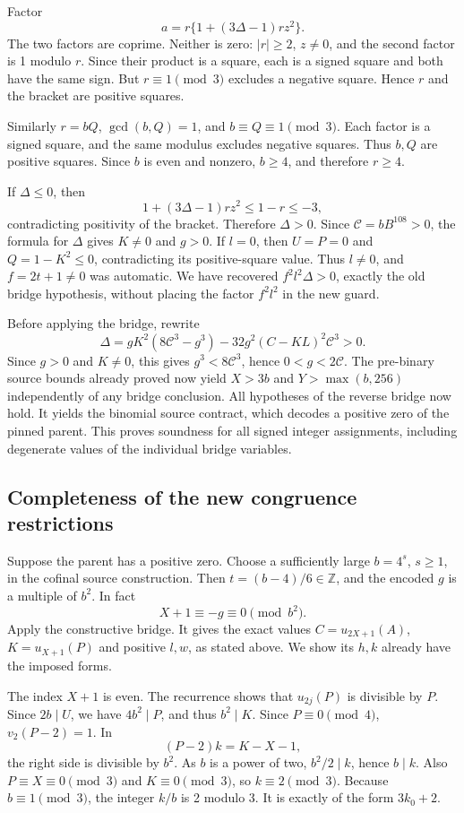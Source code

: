 Factor \[
 a=r\{1+(3\Delta-1)rz^2\}.
\] The two factors are coprime. Neither is zero: \(|r|\ge2\), \(z\ne0\),
and the second factor is 1 modulo \(r\). Since their product is a
square, each is a signed square and both have the same sign. But
\(r\equiv1\pmod3\) excludes a negative square. Hence \(r\) and the
bracket are positive squares.

Similarly \(r=bQ\), \(\gcd(b,Q)=1\), and \(b\equiv Q\equiv1\pmod3\).
Each factor is a signed square, and the same modulus excludes negative
squares. Thus \(b,Q\) are positive squares. Since \(b\) is even and
nonzero, \(b\ge4\), and therefore \(r\ge4\).

If \(\Delta\le0\), then \[
 1+(3\Delta-1)rz^2\le1-r\le-3,
\] contradicting positivity of the bracket. Therefore \(\Delta>0\).
Since \(\mathcal C=bB^{108}>0\), the formula for \(\Delta\) gives
\(K\ne0\) and \(g>0\). If \(l=0\), then \(U=P=0\) and \(Q=1-K^2\le0\),
contradicting its positive-square value. Thus \(l\ne0\), and
\(f=2t+1\ne0\) was automatic. We have recovered \(f^2l^2\Delta>0\),
exactly the old bridge hypothesis, without placing the factor \(f^2l^2\)
in the new guard.

Before applying the bridge, rewrite
\[
\Delta=gK^2(8\mathcal C^3-g^3)-32g^2(C-KL)^2\mathcal C^3>0.
\]
Since $g>0$ and $K\ne0$, this gives $g^3<8\mathcal C^3$, hence $0<g<2\mathcal C$. The pre-binary source bounds already proved now yield $X>3b$ and $Y>\max(b,256)$ independently of any bridge conclusion. All hypotheses of the reverse bridge now hold. It yields the binomial
source contract, which decodes a positive zero of the pinned parent.
This proves soundness for all signed integer assignments, including
degenerate values of the individual bridge variables.

\subsection{Completeness of the new congruence
restrictions}\label{completeness-of-the-new-congruence-restrictions}

Suppose the parent has a positive zero. Choose a sufficiently large
\(b=4^s\), \(s\ge1\), in the cofinal source construction. Then
\(t=(b-4)/6\in\mathbb Z\), and the encoded \(g\) is a multiple of
\(b^2\). In fact \[
 X+1\equiv-g\equiv0\pmod{b^2}.
\] Apply the constructive bridge. It gives the exact values
\(C=u_{2X+1}(A)\), \(K=u_{X+1}(P)\) and positive \(l,w\), as stated
above. We show its \(h,k\) already have the imposed forms.

The index \(X+1\) is even. The recurrence shows that \(u_{2j}(P)\) is
divisible by \(P\). Since \(2b\mid U\), we have \(4b^2\mid P\), and thus
\(b^2\mid K\). Since \(P\equiv0\pmod4\), \(v_2(P-2)=1\). In \[
 (P-2)k=K-X-1,
\] the right side is divisible by \(b^2\). As \(b\) is a power of two,
\(b^2/2\mid k\), hence \(b\mid k\). Also \(P\equiv X\equiv0\pmod3\) and
\(K\equiv0\pmod3\), so \(k\equiv2\pmod3\). Because \(b\equiv1\pmod3\),
the integer \(k/b\) is 2 modulo 3. It is exactly of the form \(3k_0+2\).

